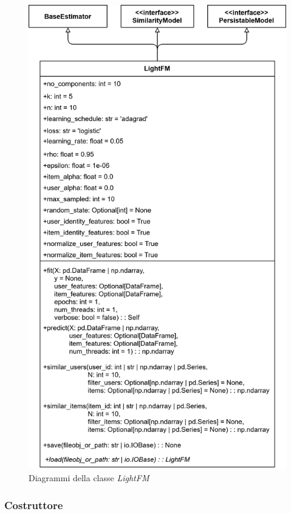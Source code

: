 \begin{figure}[H]
    \centering
    \includegraphics[scale=0.2]{figures/UML/models/light_fm.png}
    \caption{Diagrammi della classe \textit{LightFM}}
\end{figure}

\subsubsection{Costruttore}

